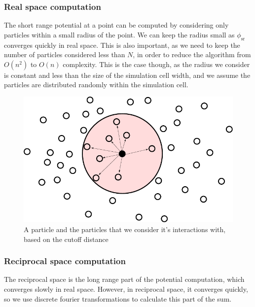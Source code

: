 \documentclass[pdftex,twoside,a4paper]{report}
\newcommand{\bcen}{\begin{center}}
\newcommand{\ecen}{\end{center}}
\begin{document}
\subsubsection{Real space computation}
The short range potential at a point can be computed by considering only particles within a small radius of the point. We can keep the radius small as $\phi_{\text{sr}}$ converges quickly in real space. This is also important, as we need to keep the number of particles considered less than $N$, in order to reduce the algorithm from $O(n^2)$ to $O(n)$ complexity. This is the case though, as the radius we consider is constant and less than the size of the simulation cell width, and we assume the particles are distributed randomly within the simulation cell.
\begin{figure}
\bcen \includegraphics{figures/cutoff.pdf} \ecen
\caption{A particle and the particles that we consider it's interactions with, based on the cutoff distance}
\end{figure}

\subsubsection{Reciprocal space computation}
The reciprocal space is the long range part of the potential computation, which converges slowly in real space. However, in reciprocal space, it converges quickly, so we use discrete fourier transformations to calculate this part of the sum.\\
\end{document}
